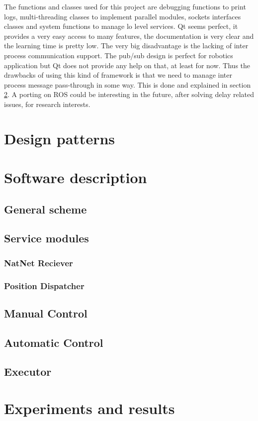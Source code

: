 The functions and classes used for this project are debugging functions to print logs, multi-threading classes to implement parallel modules, sockets interfaces classes and system functions to manage lo level services. Qt seems perfect, it provides a very easy access to many features, the documentation is very clear and the learning time is pretty low. The very big disadvantage is the lacking of inter process communication support. The pub/sub design is perfect for robotics application but Qt does not provide any help on that, at least for now. Thus the drawbacks of using this kind of framework is that we need to manage inter process message pass-through in some way. This is done and explained in section \ref{sec:sofdescrip}. A porting on ROS could be interesting in the future, after solving delay related issues, for research interests.
\section{Design patterns}
\label{sec:patterns}


\section{Software description}
\label{sec:sofdescrip}

\subsection{General scheme}
\subsection{Service modules}
\subsubsection{NatNet Reciever}
\subsubsection{Position Dispatcher}
\subsection{Manual Control}
\subsection{Automatic Control}
\subsection {Executor}

\section{Experiments and results}